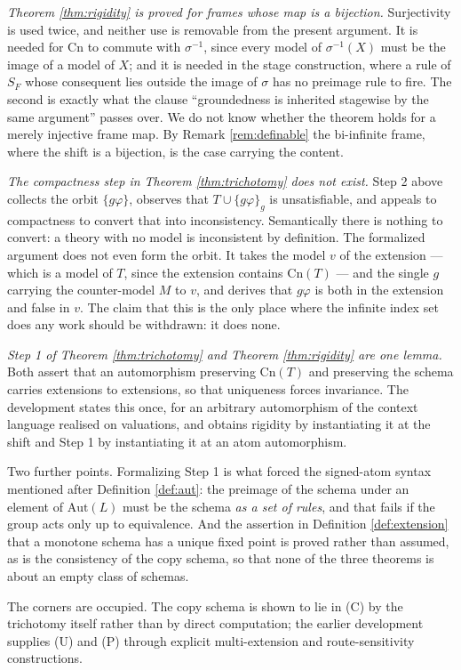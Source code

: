 \documentclass[11pt]{article}
\theoremstyle{plain}
\theoremstyle{definition}
\theoremstyle{remark}
\newcommand{\Cn}{\mathrm{Cn}}
\newcommand{\Aut}{\mathrm{Aut}}
\begin{document}
\emph{Theorem \ref{thm:rigidity} is proved for frames whose map is a
bijection.} Surjectivity is used twice, and neither use is removable from the
present argument. It is needed for $\Cn$ to commute with $\sigma^{-1}$, since
every model of $\sigma^{-1}(X)$ must be the image of a model of $X$; and it is
needed in the stage construction, where a rule of $S_F$ whose consequent lies
outside the image of $\sigma$ has no preimage rule to fire. The second is
exactly what the clause ``groundedness is inherited stagewise by the same
argument'' passes over. We do not know whether the theorem holds for a merely
injective frame map. By Remark \ref{rem:definable} the bi-infinite frame, where
the shift is a bijection, is the case carrying the content.

\emph{The compactness step in Theorem \ref{thm:trichotomy} does not exist.}
Step 2 above collects the orbit $\{g\varphi\}$, observes that
$T \cup \{g\varphi\}_g$ is unsatisfiable, and appeals to compactness to convert
that into inconsistency. Semantically there is nothing to convert: a theory with
no model is inconsistent by definition. The formalized argument does not even
form the orbit. It takes the model $v$ of the extension --- which is a model of
$T$, since the extension contains $\Cn(T)$ --- and the single $g$ carrying the
counter-model $M$ to $v$, and derives that $g\varphi$ is both in the extension
and false in $v$. The claim that this is the only place where the infinite index
set does any work should be withdrawn: it does none.

\emph{Step 1 of Theorem \ref{thm:trichotomy} and Theorem \ref{thm:rigidity} are
one lemma.} Both assert that an automorphism preserving $\Cn(T)$ and preserving
the schema carries extensions to extensions, so that uniqueness forces
invariance. The development states this once, for an arbitrary automorphism of
the context language realised on valuations, and obtains rigidity by
instantiating it at the shift and Step 1 by instantiating it at an atom
automorphism.

Two further points. Formalizing Step 1 is what forced the signed-atom syntax
mentioned after Definition \ref{def:aut}: the preimage of the schema under an
element of $\Aut(L)$ must be the schema \emph{as a set of rules}, and that fails
if the group acts only up to equivalence. And the assertion in Definition
\ref{def:extension} that a monotone schema has a unique fixed point is proved
rather than assumed, as is the consistency of the copy schema, so that none of
the three theorems is about an empty class of schemas.

The corners are occupied. The copy schema is shown to lie in (C) by the
trichotomy itself rather than by direct computation; the earlier development
supplies (U) and (P) through explicit multi-extension and route-sensitivity
constructions.
\end{document}
